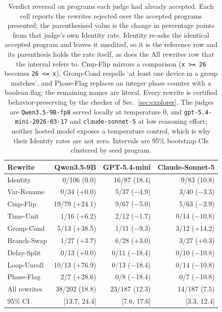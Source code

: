 \begin{table}[t]
\centering
\caption{Verdict reversal on programs each judge had already accepted. Each cell reports the rewrites rejected over the accepted programs presented; the parenthesised value is the change in percentage points from that judge's own Identity rate. Identity re-asks the identical accepted program and leaves it unedited, so it is the reference row and its parenthesis holds the rate itself, as does the All rewrites row that the interval refers to. Cmp-Flip mirrors a comparison (\texttt{x >= 26} becomes \texttt{26 <= x}), Group-Cond respells `at least one device in a group matches', and Phase-Flag replaces an integer phase counter with a boolean flag; the remaining names are literal. Every rewrite is certified behavior-preserving by the checker of Sec.~\ref{sec:explorer}. The judges are \texttt{Qwen3.5-9B-fp8} served locally at temperature 0, and \texttt{gpt-5.4-mini-2026-03-17} and \texttt{claude-sonnet-5} at low reasoning effort; neither hosted model exposes a temperature control, which is why their Identity rates are not zero. Intervals are 95\% bootstrap CIs clustered by seed program.}
\label{tab:judge}
\footnotesize
\setlength{\tabcolsep}{2.5pt}
\begin{tabular}{l rrr}
\toprule
Rewrite & Qwen3.5-9B & GPT-5.4-mini & Claude-Sonnet-5 \\
\midrule
Identity & 0/106 (0.0) & 16/87 (18.4) & 9/83 (10.8) \\
\midrule
Var-Rename & 0/34 (+0.0) & 5/37 ($-$4.9) & 3/40 ($-$3.3) \\
Cmp-Flip & 19/79 (+24.1) & 9/67 ($-$5.0) & 5/63 ($-$2.9) \\
Time-Unit & 1/16 (+6.2) & 2/12 ($-$1.7) & 0/14 ($-$10.8) \\
Group-Cond & 5/13 (+38.5) & 1/11 ($-$9.3) & 3/12 (+14.2) \\
Branch-Swap & 1/27 (+3.7) & 6/28 (+3.0) & 3/27 (+0.3) \\
Delay-Split & 0/13 (+0.0) & 0/11 ($-$18.4) & 0/10 ($-$10.8) \\
Loop-Unroll & 10/13 (+76.9) & 0/13 ($-$18.4) & 0/14 ($-$10.8) \\
Phase-Flag & 2/7 (+28.6) & 0/8 ($-$18.4) & 0/7 ($-$10.8) \\
\midrule
All rewrites & 38/202 (18.8) & 23/187 (12.3) & 14/187 (7.5) \\
95\% CI & [13.7, 24.4] & [7.6, 17.6] & [3.3, 12.4] \\
\bottomrule
\end{tabular}
\end{table}
